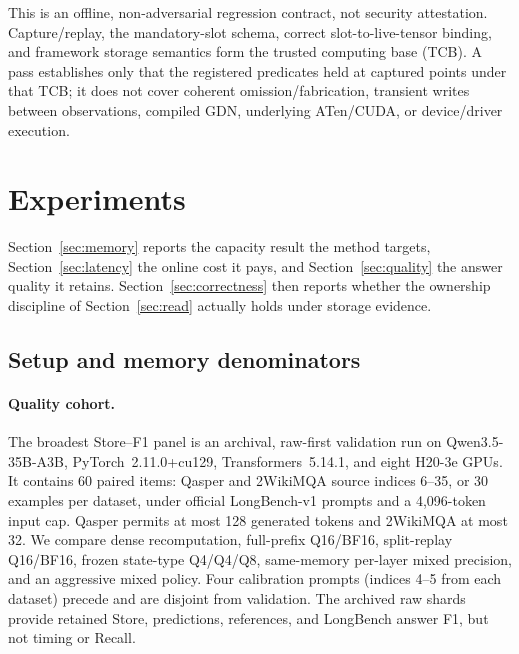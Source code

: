 \documentclass{article}
\begin{document}
This is an offline, non-adversarial regression contract, not security
attestation.  Capture/replay, the mandatory-slot schema, correct
slot-to-live-tensor binding, and framework storage semantics form the trusted
computing base (TCB).  A pass establishes only that the registered predicates
held at captured points under that TCB; it does not cover coherent
omission/fabrication, transient writes between observations, compiled GDN,
underlying ATen/CUDA, or device/driver execution.

\section{Experiments}
\label{sec:experiments}
\label{sec:protocol}

Section~\ref{sec:memory} reports the capacity result the method targets,
Section~\ref{sec:latency} the online cost it pays, and
Section~\ref{sec:quality} the answer quality it retains.
Section~\ref{sec:correctness} then reports whether the ownership discipline of
Section~\ref{sec:read} actually holds under storage evidence.

\subsection{Setup and memory denominators}
\label{sec:setup}

\paragraph{Quality cohort.}
The broadest Store--F1 panel is an archival, raw-first validation run on
Qwen3.5-35B-A3B, PyTorch~2.11.0+cu129, Transformers~5.14.1, and eight H20-3e
GPUs.  It contains 60 paired items: Qasper and 2WikiMQA source indices 6--35,
or 30 examples per dataset, under official LongBench-v1 prompts and a
4,096-token input cap.  Qasper permits at most 128 generated tokens and
2WikiMQA at most 32.  We compare dense recomputation, full-prefix Q16/BF16,
split-replay Q16/BF16, frozen state-type Q4/Q4/Q8, same-memory per-layer mixed
precision, and an aggressive mixed policy.  Four calibration prompts (indices
4--5 from each dataset) precede and are disjoint from validation.  The archived
raw shards provide retained Store, predictions, references, and LongBench
answer F1, but not timing or Recall.
\end{document}
